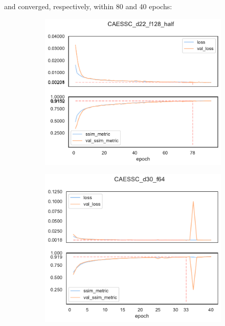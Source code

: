  and  converged, respectively, within 80 and 40 epochs:
\begin{figure}[H]
    \begin{subfigure}{\textwidth}
        \centering
        \includegraphics[scale=0.5]{subsections/caessc/plot_history_CAESSC_d22_f128_half.pdf}        
    \end{subfigure}
    \begin{subfigure}{\textwidth}
        \centering
        \includegraphics[scale=0.5]{subsections/caessc/plot_history_CAESSC_d30_f64.pdf}        
    \end{subfigure}
\end{figure}

